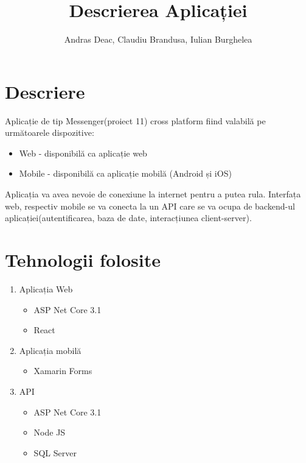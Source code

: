 \documentclass{article}
\title{Descrierea Aplicației}
\author{Andras Deac, Claudiu Brandusa, Iulian Burghelea}
\begin{document}
\maketitle{}
\newpage
\section{Descriere}
Aplicație de tip Messenger(proiect 11) cross platform fiind valabilă pe următoarele dispozitive:
\begin{itemize}
\item Web - disponibilă ca aplicație web
\item Mobile - disponibilă ca aplicație mobilă (Android și iOS)
\end{itemize}
Aplicația va avea nevoie de conexiune la internet pentru a putea rula. Interfața web, respectiv mobile se va conecta la un API care se va ocupa de backend-ul aplicației(autentificarea, baza de date, interacțiunea client-server).
\section{Tehnologii folosite}
\begin{enumerate}
\item Aplicația Web
\begin{itemize}
\item ASP Net Core 3.1
\item React
\end{itemize}
\item Aplicația mobilă
\begin{itemize}
\item Xamarin Forms
\end{itemize}
\item API
\begin{itemize}
\item ASP Net Core 3.1
\item Node JS
\item SQL Server
\end{itemize}
\end{enumerate}
\end{document}
